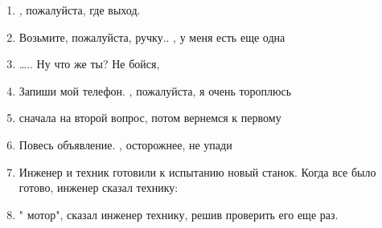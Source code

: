 \documentclass[paper=a4, fontsize=11pt]{scrartcl}
\begin{document}
\begin{enumerate}
    \item
    \raisebox{-\baselineskip}{\shortstack{\underline{\hspace{3cm}}\\sanokaa}}, пожалуйста, где выход.
    \item Возьмите, пожалуйста, ручку.. \raisebox{-\baselineskip}{\shortstack{\underline{\hspace{3cm}}\\ota}}, у меня есть еще одна 
    \item {}….. Ну что же ты? Не бойся, 
    \item Запиши мой телефон. \raisebox{-\baselineskip}{\shortstack{\underline{\hspace{3cm}}\\kirjoita}}, пожалуйста, я очень тороплюсь
    \item \raisebox{-\baselineskip}{\shortstack{\underline{\hspace{3cm}}\\vastaa}} сначала на второй вопрос, потом вернемся к первому 
    \item Повесь объявление. \raisebox{-\baselineskip}{\shortstack{\underline{\hspace{3cm}}\\ripusta}}, осторожнее, не упади
    \item Инженер и техник готовили к испытанию новый станок. Когда все было готово, инженер сказал технику: 
    \item " мотор", сказал инженер технику, решив проверить его еще раз. 
\end{enumerate}



\end{document}
